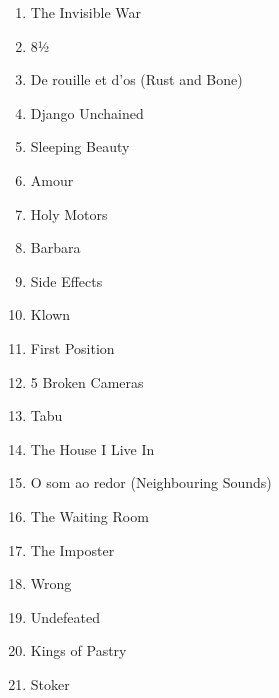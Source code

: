 \documentclass[11pt]{article}
\begin{document}
\begin{enumerate}
\item The Invisible War
\item 8½
\item De rouille et d'os (Rust and Bone)
\item Django Unchained
\item Sleeping Beauty
\item Amour
\item Holy Motors
\item Barbara
\item Side Effects
\item Klown
\item First Position
\item 5 Broken Cameras
\item Tabu
\item The House I Live In
\item O som ao redor (Neighbouring Sounds)
\item The Waiting Room
\item The Imposter
\item Wrong
\item Undefeated
\item Kings of Pastry
\item Stoker
\end{enumerate}
\end{document}

